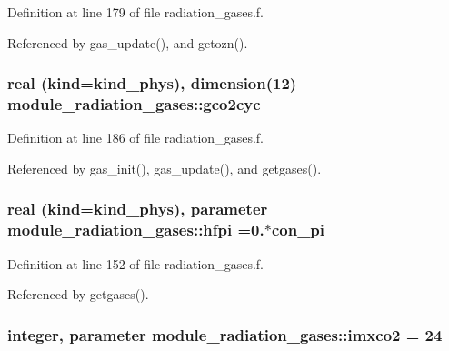 Definition at line 179 of file radiation\+\_\+gases.\+f.



Referenced by gas\+\_\+update(), and getozn().

\subsubsection[{\texorpdfstring{gco2cyc}{gco2cyc}}]{\setlength{\rightskip}{0pt plus 5cm}real (kind=kind\+\_\+phys), dimension(12) module\+\_\+radiation\+\_\+gases\+::gco2cyc\hspace{0.3cm}{\ttfamily [private]}}\hypertarget{group__module__radiation__gases_gac2a03ad96c9aa598f9751fd689cb615f}{}\label{group__module__radiation__gases_gac2a03ad96c9aa598f9751fd689cb615f}


Definition at line 186 of file radiation\+\_\+gases.\+f.



Referenced by gas\+\_\+init(), gas\+\_\+update(), and getgases().

\subsubsection[{\texorpdfstring{hfpi}{hfpi}}]{\setlength{\rightskip}{0pt plus 5cm}real (kind=kind\+\_\+phys), parameter module\+\_\+radiation\+\_\+gases\+::hfpi =0.$\ast$con\+\_\+pi\hspace{0.3cm}{\ttfamily [private]}}\hypertarget{group__module__radiation__gases_gab99c75954c59ed92a52de94ca6113f73}{}\label{group__module__radiation__gases_gab99c75954c59ed92a52de94ca6113f73}


Definition at line 152 of file radiation\+\_\+gases.\+f.



Referenced by getgases().

\subsubsection[{\texorpdfstring{imxco2}{imxco2}}]{\setlength{\rightskip}{0pt plus 5cm}integer, parameter module\+\_\+radiation\+\_\+gases\+::imxco2 = 24\hspace{0.3cm}{\ttfamily [private]}}\hypertarget{group__module__radiation__gases_ga46eb4079ff9932819b3ab133bf6a43d9}{}\label{group__module__radiation__gases_ga46eb4079ff9932819b3ab133bf6a43d9}


